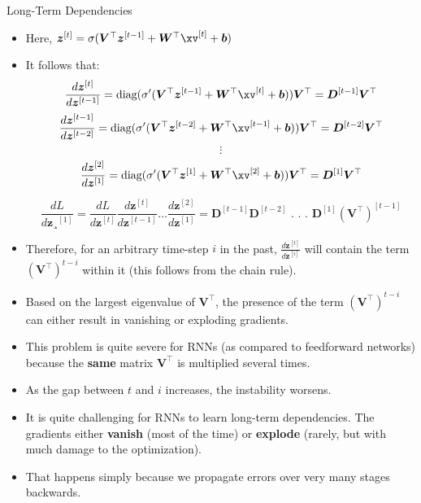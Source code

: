 \begin{vbframe}{Long-Term Dependencies}
  
  \begin{itemize}
    \item Here, $\bm{z}^{[t]} = \sigma(\bm{V}^\top \bm{z}^{[t-1]} + \bm{W}^\top \xv^{[t]} + \bm{b})$
    \item It follows that:
    $$ \frac{d \bm{z}^{[t]}}{d\bm{z}^{[t-1]}} = \text{diag}(\sigma' (\bm{V}^\top \bm{z}^{[t-1]} + \bm{W}^\top \xv^{[t]} + \bm{b})) \bm{V}^\top = \bm{D}^{[t-1]} \bm{V}^\top $$
    $$ \frac{d \bm{z}^{[t-1]}}{d\bm{z}^{[t-2]}} = \text{diag}(\sigma' (\bm{V}^\top \bm{z}^{[t-2]} + \bm{W}^\top \xv^{[t-1]} + \bm{b})) \bm{V}^\top= \bm{D}^{[t-2]} \bm{V}^\top $$
    $$ \vdots $$
    $$ \frac{d \bm{z}^{[2]}}{d\bm{z}^{[1]}} = \text{diag}(\sigma' (\bm{V}^\top \bm{z}^{[1]} + \bm{W}^\top \xv^{[2]} + \bm{b})) \bm{V}^\top = \bm{D}^{[1]} \bm{V}^\top $$
    
    $$ \frac{d L}{d \bm{z}¸^{[1]}} = \frac{d L}{d \bm{z}^{[t]}} \frac{d \bm{z}^{[t]}}{d \bm{z}^{[t-1]}} \dots \frac{d \bm{z}^{[2]}}{d \bm{z}^{[1]}} = \bm{D}^{[t-1]} \bm{D}^{[t-2]}   \text{ . . . } \bm{D}^{[1]} (\bm{V}^\top)^{[t-1]}$$
    \item Therefore, for an arbitrary time-step $i$ in the past, $\frac{d\bm{z}^{[t]}}{d\bm{z}^{[i]}}$ will contain the term $(\bm{V}^\top)^{t-i}$ within it (this follows from the chain rule).
    \item Based on the largest eigenvalue of $\bm{V}^\top$, the presence of the term $(\bm{V}^\top)^{t-i}$ can either result in vanishing or exploding gradients.
    \item This problem is quite severe for RNNs (as compared to feedforward networks) because the \textbf{same} matrix $\bm{V}^\top$ is multiplied several times. \href{https://tinyurl.com/vangrad}{}
    \item As the gap between $t$ and $i$ increases, the instability worsens.
    \item It is quite challenging for RNNs to learn long-term dependencies. The gradients either \textbf{vanish} (most of the time) or \textbf{explode} (rarely, but with much damage to the optimization).
    \item That happens simply because we propagate errors over very many stages backwards.
  \end{itemize}
  

\end{vbframe}
